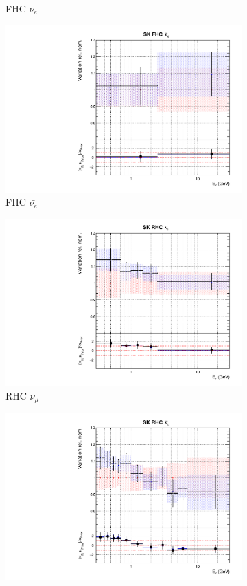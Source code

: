 \begin{figure}[!htbp]
\begin{subfigure}{0.45\textwidth}
  \caption{\SK FHC $\nu_{e}$}
\end{subfigure}
\begin{subfigure}{0.45\textwidth}
  \centering
  \includegraphics[width=0.75\linewidth]{figs/jointflux11}
  \caption{\SK FHC $\bar{\nu_{e}}$}
\end{subfigure}
\begin{subfigure}{0.45\textwidth}
  \centering
  \includegraphics[width=0.75\linewidth]{figs/jointflux12}
  \caption{\SK RHC $\nu_{\mu}$}
\end{subfigure}
\begin{subfigure}{0.45\textwidth}
  \centering
  \includegraphics[width=0.75\linewidth]{figs/jointflux13}

\end{subfigure}
\end{figure}
